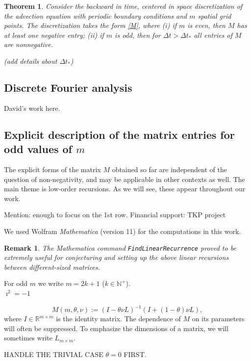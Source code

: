 \documentclass[a4paper]{article}
\newtheorem{theorem}{Theorem}
\newtheorem{remark}{Remark}
\newcommand{\dt}{\Delta t}
\newcommand{\te}{\theta}
\newcommand{\nplus}{\mathbb{N}^+}
\newcommand{\rr}{\mathbb{R}}
\begin{document}
\begin{theorem}
Consider the backward in time, centered in space discretization of the
advection equation with periodic boundary conditions and $m$ spatial grid
points.  The discretization takes the form \eqref{M},
where (i) if $m$ is even, then $M$ has at least one negative entry;
(ii) if $m$ is odd, then for $\dt>\dt_*$ all entries of $M$ are nonnegative.

(add details about $\dt_*$)
\end{theorem}

\subsection{Discrete Fourier analysis}
David's work here.

\subsection{Explicit description of the matrix entries for odd values of $m$}\label{explsect}

The explicit forms of the matrix $M$ obtained so far are independent of the question of non-negativity, and may be applicable in other contexts as well. The main theme is low-order recursions. As we will see, these appear throughout our work.

Mention: enough to focus on the 1st row.
Financial support: TKP project

We used Wolfram \textit{Mathematica} (version 11) for the computations in this work.
\begin{remark}
The  \textit{Mathematica}  command {\tt{FindLinearRecurrence}} proved to be extremely useful for conjecturing and setting up the above linear recursions between different-sized matrices. 
\end{remark}

For odd $m$ we write $m=2k+1$ ($k\in\nplus$).\\

$\imath^2=-1$ 

\begin{equation}\label{Mdef}
M(m,\te,\nu):=(I-\te\nu L)^{-1}(I+(1-\te)\nu L),
\end{equation}
where $I\in\rr^{m\times m}$ is the identity matrix. The dependence of $M$ on its parameters will often be suppressed. To emphasize the dimensions of a matrix, we will sometimes write $L_{m\times m}$.




HANDLE THE TRIVIAL CASE $\te=0$ FIRST.\\
\end{document}

